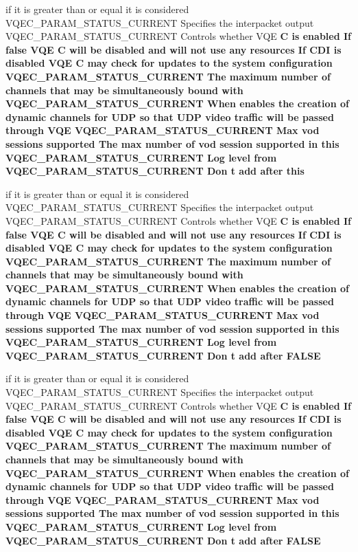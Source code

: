 \begin{CompactItemize}
\item 
if it is greater than or equal it is considered VQEC\_\-PARAM\_\-STATUS\_\-CURRENT Specifies the interpacket output VQEC\_\-PARAM\_\-STATUS\_\-CURRENT Controls whether VQE \bf{C} is enabled If false VQE \bf{C} will be disabled and will not use any resources If CDI is disabled VQE \bf{C} may check for updates \bf{to} the system configuration VQEC\_\-PARAM\_\-STATUS\_\-CURRENT The maximum number of \bf{channels} that may be simultaneously bound with VQEC\_\-PARAM\_\-STATUS\_\-CURRENT When enables the creation of dynamic \bf{channels} for UDP so that UDP video traffic will be passed through VQE VQEC\_\-PARAM\_\-STATUS\_\-CURRENT Max vod sessions supported The max number of vod session supported in \bf{this} VQEC\_\-PARAM\_\-STATUS\_\-CURRENT Log level from VQEC\_\-PARAM\_\-STATUS\_\-CURRENT Don t add after \bf{this}
\item 
if it is greater than or equal it is considered VQEC\_\-PARAM\_\-STATUS\_\-CURRENT Specifies the interpacket output VQEC\_\-PARAM\_\-STATUS\_\-CURRENT Controls whether VQE \bf{C} is enabled If false VQE \bf{C} will be disabled and will not use any resources If CDI is disabled VQE \bf{C} may check for updates \bf{to} the system configuration VQEC\_\-PARAM\_\-STATUS\_\-CURRENT The maximum number of \bf{channels} that may be simultaneously bound with VQEC\_\-PARAM\_\-STATUS\_\-CURRENT When enables the creation of dynamic \bf{channels} for UDP so that UDP video traffic will be passed through VQE VQEC\_\-PARAM\_\-STATUS\_\-CURRENT Max vod sessions supported The max number of vod session supported in \bf{this} VQEC\_\-PARAM\_\-STATUS\_\-CURRENT Log level from VQEC\_\-PARAM\_\-STATUS\_\-CURRENT Don t add after \bf{FALSE}
\item 
if it is greater than or equal it is considered VQEC\_\-PARAM\_\-STATUS\_\-CURRENT Specifies the interpacket output VQEC\_\-PARAM\_\-STATUS\_\-CURRENT Controls whether VQE \bf{C} is enabled If false VQE \bf{C} will be disabled and will not use any resources If CDI is disabled VQE \bf{C} may check for updates \bf{to} the system configuration VQEC\_\-PARAM\_\-STATUS\_\-CURRENT The maximum number of \bf{channels} that may be simultaneously bound with VQEC\_\-PARAM\_\-STATUS\_\-CURRENT When enables the creation of dynamic \bf{channels} for UDP so that UDP video traffic will be passed through VQE VQEC\_\-PARAM\_\-STATUS\_\-CURRENT Max vod sessions supported The max number of vod session supported in \bf{this} VQEC\_\-PARAM\_\-STATUS\_\-CURRENT Log level from VQEC\_\-PARAM\_\-STATUS\_\-CURRENT Don t add after \bf{FALSE}

\end{CompactItemize}
